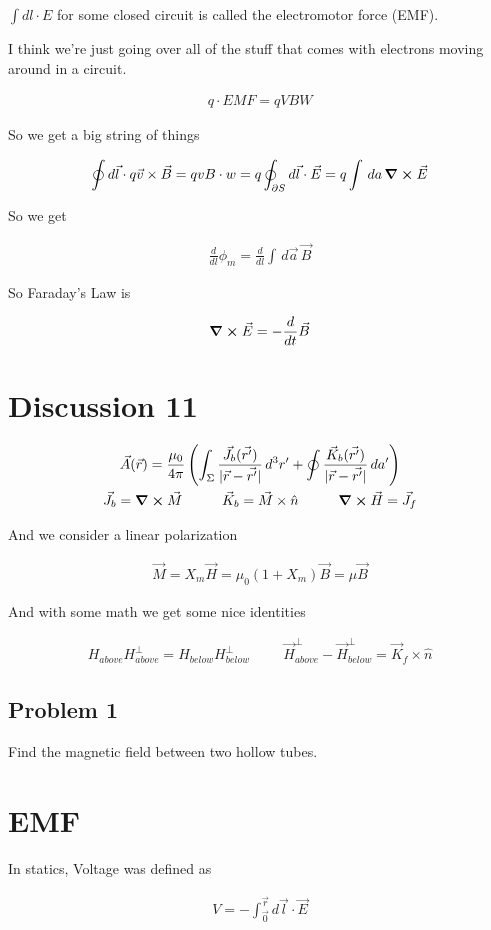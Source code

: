\documentclass[fleqn]{report}
\newcommand{\hp}{\hspace{1cm}}
\newcommand{\del}{\partial}
\newcommand{\equations} [1] {
\begin{gather*}
#1
\end{gather*}
}
\begin{document}
$\int dl \cdot E$ for some closed circuit is called the electromotor force (EMF). 

I think we're just going over all of the stuff that comes with 
electrons moving around in a circuit. 

\equations{
    q \cdot EMF = q V B W 
}

So we get a big string of things 
\equations{
    \oint d \vec l \cdot q \vec v \times \vec B 
    = 
    q v B \cdot w 
    =
    q 
    \oint_{\del S}
    d \vec l \cdot \vec E 
    =
    q \int \, da \, 
    \curl \vec E 
}

So we get 
\equations{
    \frac{d}{dl} \phi_m 
    = 
    \frac{d}{dl}
    \int \, d\vec a \, \vec B 
}

So Faraday's Law is 
\equations{
    \curl \vec E 
    =
    - \frac{d}{dt} \vec B 
}

\section{Discussion 11}
\equations{
    \vec A(\vec r)
    =
    \frac{\mu_0}{4 \pi}
    \left(
        \int_{\Sigma}
        \frac{\vec J_b(\vec{r'})}{|\vec r - \vec{r'}|}
        \, d^3 r' 
        +
        \oint 
        \frac{\vec K_b(\vec{r'})}{|\vec r - \vec{r'}|}
        \, d a'
    \right)
    \\
    \vec J_b = \curl \vec M 
    \hp 
    \vec K_b = \vec M \times \hat n 
    \hp 
    \curl \vec H 
    =
    \vec J_{f}
}

And we consider a linear polarization 
\equations{
    \vec M = X_m \vec H 
    =
    \mu_0 (1 + X_m) \vec B 
    =
    \mu \vec B 
}

And with some math we get some nice identities 
\equations{
    H_{above} H^{\perp}_{above}
    =
    H_{below} H^{\perp}_{below}
    \hp 
    \vec H^{\perp}_{above}
    -
    \vec H^{\perp}_{below}
    =
    \vec K_f \times \hat n 
}

\subsection{Problem 1}
Find the magnetic field between two hollow tubes. 

\section{EMF}
In statics, Voltage was defined as 
\equations{
    V 
    =
    -
    \int^{\vec r}_{\vec 0}
    d \vec l \cdot \vec E 
}
\end{document}
